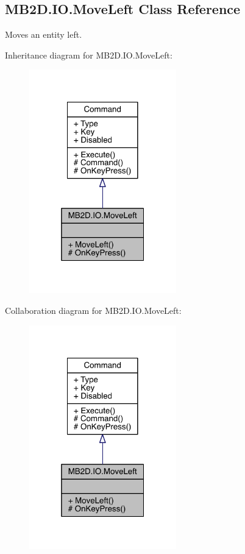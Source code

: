 \hypertarget{class_m_b2_d_1_1_i_o_1_1_move_left}{}\subsection{M\+B2\+D.\+I\+O.\+Move\+Left Class Reference}
\label{class_m_b2_d_1_1_i_o_1_1_move_left}


Moves an entity left.  




Inheritance diagram for M\+B2\+D.\+I\+O.\+Move\+Left\+:
\nopagebreak
\begin{figure}[H]
\begin{center}
\leavevmode
\includegraphics[width=181pt]{class_m_b2_d_1_1_i_o_1_1_move_left__inherit__graph}
\end{center}
\end{figure}


Collaboration diagram for M\+B2\+D.\+I\+O.\+Move\+Left\+:
\nopagebreak
\begin{figure}[H]
\begin{center}
\leavevmode
\includegraphics[width=181pt]{class_m_b2_d_1_1_i_o_1_1_move_left__coll__graph}
\end{center}
\end{figure}
